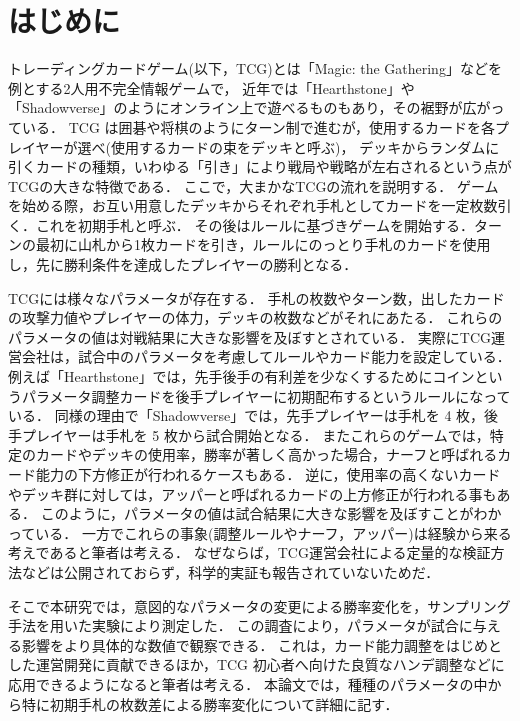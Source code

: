 \documentclass[twocolumn]{ltjsarticle}
\begin{document}
\section{はじめに}
\small{
  トレーディングカードゲーム(以下，TCG)とは「Magic: the Gathering」などを例とする2人用不完全情報ゲームで，
  近年では「Hearthstone」や「Shadowverse」のようにオンライン上で遊べるものもあり，その裾野が広がっている．%
  TCG は囲碁や将棋のようにターン制で進むが，使用するカードを各プレイヤーが選べ(使用するカードの束をデッキと呼ぶ)，
  デッキからランダムに引くカードの種類，いわゆる「引き」により戦局や戦略が左右されるという点がTCGの大きな特徴である．
  ここで，大まかなTCGの流れを説明する．%
  ゲームを始める際，お互い用意したデッキからそれぞれ手札としてカードを一定枚数引く．これを初期手札と呼ぶ．
  その後はルールに基づきゲームを開始する．ターンの最初に山札から1枚カードを引き，ルールにのっとり手札のカードを使用し，先に勝利条件を達成したプレイヤーの勝利となる．

  TCGには様々なパラメータが存在する．
  手札の枚数やターン数，出したカードの攻撃力値やプレイヤーの体力，デッキの枚数などがそれにあたる．
  これらのパラメータの値は対戦結果に大きな影響を及ぼすとされている．
  実際にTCG運営会社は，試合中のパラメータを考慮してルールやカード能力を設定している．%
  例えば「Hearthstone」では，先手後手の有利差を少なくするためにコインというパラメータ調整カードを後手プレイヤーに初期配布するというルールになっている．
  同様の理由で「Shadowverse」では，先手プレイヤーは手札を 4 枚，後手プレイヤーは手札を 5 枚から試合開始となる．
  またこれらのゲームでは，特定のカードやデッキの使用率，勝率が著しく高かった場合，ナーフと呼ばれるカード能力の下方修正が行われるケースもある．
  逆に，使用率の高くないカードやデッキ群に対しては，アッパーと呼ばれるカードの上方修正が行われる事もある．%
  このように，パラメータの値は試合結果に大きな影響を及ぼすことがわかっている．
  一方でこれらの事象(調整ルールやナーフ，アッパー)は経験から来る考えであると筆者は考える．
  なぜならば，TCG運営会社による定量的な検証方法などは公開されておらず，科学的実証も報告されていないためだ．

  そこで本研究では，意図的なパラメータの変更による勝率変化を，サンプリング手法を用いた実験により測定した．%
  この調査により，パラメータが試合に与える影響をより具体的な数値で観察できる．%
  これは，カード能力調整をはじめとした運営開発に貢献できるほか，TCG 初心者へ向けた良質なハンデ調整などに応用できるようになると筆者は考える．
  本論文では，種種のパラメータの中から特に初期手札の枚数差による勝率変化について詳細に記す．
}
\end{document}
